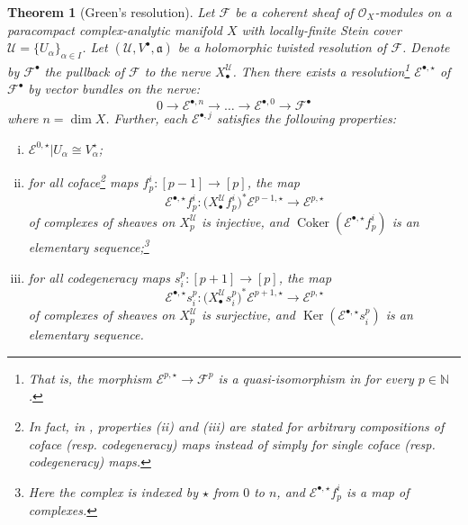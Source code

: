 \documentclass[11pt,fleqn]{article}
\theoremstyle{plain}
\newtheorem{theorem}{Theorem}[subsection]
\theoremstyle{definition}
\theoremstyle{remark}
\numberwithin{equation}{theorem}
\newcommand{\cover}{\mathcal{U}}
\newcommand{\OO}{\mathcal{O}}
\newcommand{\anotherbullet}{\star}
\newcommand{\restricted}{\mathbin{\big\vert}}
\newcommand{\twc}{\mathfrak{a}}
\newcommand{\nerve}[1]{X_{#1}^\cover}
\DeclareMathOperator{\Ker}{Ker}
\DeclareMathOperator{\Coker}{Coker}
\begin{document}
        \begin{theorem}[Green's resolution]\label{theorem:green's-resolution}
            Let $\mathscr{F}$ be a coherent sheaf of $\OO_X$-modules on a paracompact complex-analytic manifold $X$ with locally-finite Stein cover $\cover=\{U_\alpha\}_{\alpha\in I}$.
            Let $(\cover,V^\bullet,\twc)$ be a holomorphic twisted resolution of $\mathscr{F}$.
            Denote by $\mathscr{F}^\bullet$ the pullback of $\mathscr{F}$ to the nerve $\nerve{\bullet}$.
            Then there exists a resolution\footnote{That is, the morphism $\mathcal{E}^{p,\anotherbullet}\to\mathscr{F}^p$ is a quasi-isomorphism in for every $p\in\mathbb{N}$.} $\mathcal{E}^{\bullet,\anotherbullet}$ of $\mathscr{F}^\bullet$ by vector bundles on the nerve:
            \begin{equation*}
                0 \to \mathcal{E}^{\bullet,n} \to \ldots \to \mathcal{E}^{\bullet,0} \to \mathscr{F}^\bullet
            \end{equation*}
            where $n=\dim X$.
            Further, each $\mathcal{E}^{\bullet,j}$ satisfies the following properties:
            \begin{enumerate}[(i)]
                \item $\mathcal{E}^{0,\anotherbullet}\restricted {U_\alpha} \cong V^\anotherbullet_\alpha$;
                \item for all coface\footnote{In fact, in \cite[§1.4]{Green1980}, properties (ii) and (iii) are stated for arbitrary compositions of coface (resp. codegeneracy) maps instead of simply for single coface (resp. codegeneracy) maps.} maps $f_p^i\colon[p-1]\to[p]$, the map
                    \[
                        \mathcal{E}^{\bullet,\anotherbullet} f_p^i\colon \big(\nerve{\bullet} f_p^i\big)^*\mathcal{E}^{p-1,\anotherbullet}\to\mathcal{E}^{p,\anotherbullet}
                    \]
                    of complexes of sheaves on $\nerve{p}$ is injective, and $\Coker\left(\mathcal{E}^{\bullet,\anotherbullet} f_p^i\right)$ is an elementary sequence;\footnote{Here the complex is indexed by $\anotherbullet$ from $0$ to $n$, and $\mathcal{E}^{\bullet,\anotherbullet} f_p^i$ is a map of complexes.}
                \item for all codegeneracy maps $s_i^p\colon[p+1]\to[p]$, the map
                    \[
                        \mathcal{E}^{\bullet,\anotherbullet} s_i^p\colon \big(\nerve{\bullet} s_i^p\big)^*\mathcal{E}^{p+1,\anotherbullet}\to\mathcal{E}^{p,\anotherbullet}
                    \]
                    of complexes of sheaves on $\nerve{p}$ is surjective, and $\Ker\left(\mathcal{E}^{\bullet,\anotherbullet} s_i^p\right)$ is an elementary sequence.

\end{enumerate}
\end{theorem}
\end{document}
